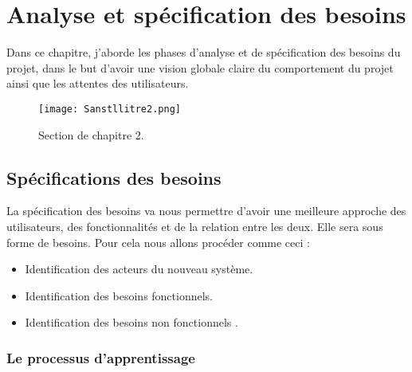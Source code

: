 \chapter{Analyse et spécification des besoins}
\label{sec:unchapitre}

\begin{fquote}Dans ce chapitre, j’aborde les phases d’analyse et de spécification des besoins du projet, dans le but d’avoir une vision globale claire du comportement du projet ainsi que les attentes des utilisateurs.
 \end{fquote}
\begin{figure}[ht]
	\centering
	\texttt{[image: Sanstllitre2.png]}
	\caption{Section de chapitre 2.}
	\label{fig:Section de chapitre 2}
\end{figure}
\FloatBarrier
\clearpage

\section{Spécifications des besoins}

La spécification des besoins va nous permettre d’avoir une meilleure approche des utilisateurs, des fonctionnalités et de la relation entre les deux. Elle sera sous forme de besoins. Pour cela nous allons procéder comme ceci :
\begin{itemize}
	\item Identification des acteurs du nouveau système.
	\item Identification des besoins fonctionnels.
	\item Identification des besoins non fonctionnels .
\end{itemize}

\subsection{Le processus d’apprentissage}

